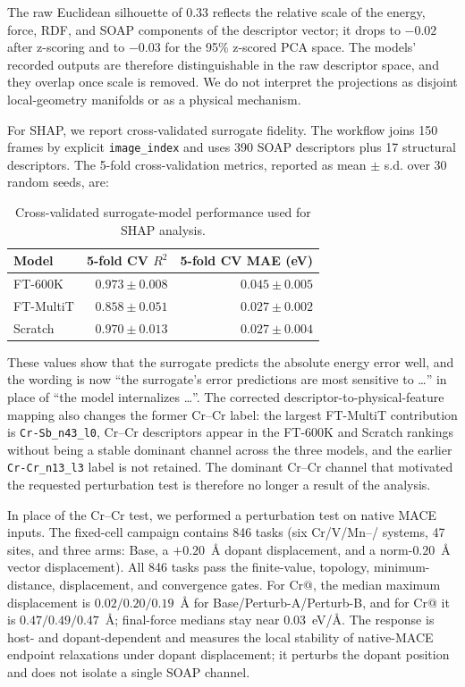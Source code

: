 \documentclass[11pt,a4paper]{article}
\begin{document}
The raw Euclidean silhouette of 0.33 reflects the relative scale of the energy, force, RDF, and SOAP components of the descriptor vector; it drops to $-0.02$ after z-scoring and to $-0.03$ for the 95\% z-scored PCA space. The models' recorded outputs are therefore distinguishable in the raw descriptor space, and they overlap once scale is removed. We do not interpret the projections as disjoint local-geometry manifolds or as a physical mechanism.

For SHAP, we report cross-validated surrogate fidelity. The workflow joins 150 frames by explicit \texttt{image\_index} and uses 390 SOAP descriptors plus 17 structural descriptors. The 5-fold cross-validation metrics, reported as mean $\pm$ s.d. over 30 random seeds, are:

\begin{table}[h]
\centering
\caption{Cross-validated surrogate-model performance used for SHAP analysis.}
\begin{tabular}{lrr}
\toprule
Model & 5-fold CV $R^2$ & 5-fold CV MAE (eV) \\
\midrule
FT-600K & $0.973 \pm 0.008$ & $0.045 \pm 0.005$ \\
FT-MultiT & $0.858 \pm 0.051$ & $0.027 \pm 0.002$ \\
Scratch & $0.970 \pm 0.013$ & $0.027 \pm 0.004$ \\
\bottomrule
\end{tabular}
\end{table}

These values show that the surrogate predicts the absolute energy error well, and the wording is now ``the surrogate's error predictions are most sensitive to \ldots'' in place of ``the model internalizes \ldots''. The corrected descriptor-to-physical-feature mapping also changes the former Cr--Cr label: the largest FT-MultiT contribution is \texttt{Cr-Sb\_n43\_l0}, Cr--Cr descriptors appear in the FT-600K and Scratch rankings without being a stable dominant channel across the three models, and the earlier \texttt{Cr-Cr\_n13\_l3} label is not retained. The dominant Cr--Cr channel that motivated the requested perturbation test is therefore no longer a result of the analysis.

In place of the Cr--Cr test, we performed a perturbation test on native MACE inputs. The fixed-cell campaign contains 846 tasks (six Cr/V/Mn--/ systems, 47 sites, and three arms: Base, a $+0.20$~\AA{} dopant displacement, and a norm-$0.20$~\AA{} vector displacement). All 846 tasks pass the finite-value, topology, minimum-distance, displacement, and convergence gates. For Cr@, the median maximum displacement is $0.02/0.20/0.19$~\AA{} for Base/Perturb-A/Perturb-B, and for Cr@ it is $0.47/0.49/0.47$~\AA{}; final-force medians stay near $0.03$~eV/\AA{}. The response is host- and dopant-dependent and measures the local stability of native-MACE endpoint relaxations under dopant displacement; it perturbs the dopant position and does not isolate a single SOAP channel.
\end{document}
